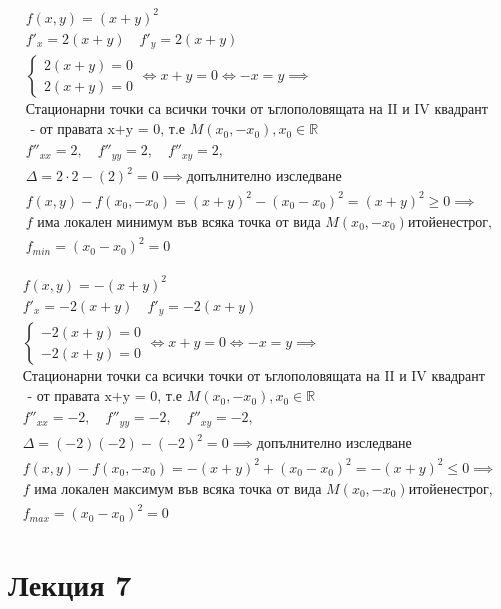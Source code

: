 \documentclass[a4paper,fleqn,12pt]{article}
\theoremstyle{definition}
\begin{document}
\begin{gather*}
f(x,y) = (x+y)^2\\
f'_x = 2(x+y) \quad f'_y = 2(x+y)  \\
\begin{cases}
2(x+y)= 0 \\ 
2(x+y) = 0 
\end{cases} 
\iff x+y = 0 \iff -x = y \implies \\
\text{Стационарни точки са всички точки от ъглополовящата на II и IV квадрант} \\
\text{ -  от правата x+y = 0, т.е $M(x_0, -x_0), x_0 \in \mathbb{R}$} \\
f''_{xx} = 2, \quad f''_{yy} = 2, \quad f''_{xy} = 2, \\
\Delta = 2 \cdot 2 - (2)^2 = 0 \implies \text{допълнително изследване} \\
f(x,y) - f(x_0, -x_0) =  (x+y)^2 - (x_0 -x_0) ^2 = (x+y)^2 \geq 0 \implies \\
f \text{ има локален минимум във всяка точка от вида } M(x_0, -x_0) и той е нестрог, \\
f_{min} = (x_0 -x_0) ^2 = 0
\end{gather*}

\begin{gather*}
f(x,y) = -(x+y)^2\\
f'_x = -2(x+y) \quad f'_y = -2(x+y)  \\
\begin{cases}
-2(x+y)= 0 \\ 
-2(x+y) = 0 
\end{cases} 
\iff x+y = 0 \iff -x = y \implies \\
\text{Стационарни точки са всички точки от ъглополовящата на II и IV квадрант} \\
\text{ -  от правата x+y = 0, т.е $M(x_0, -x_0), x_0 \in \mathbb{R}$} \\
f''_{xx} = -2, \quad f''_{yy} = -2, \quad f''_{xy} = -2, \\
\Delta = (-2)(-2) - (-2)^2 = 0 \implies \text{допълнително изследване} \\
f(x,y) - f(x_0, -x_0) =  -(x+y)^2 + (x_0 -x_0) ^2 = -(x+y)^2 \leq 0 \implies \\
f \text{ има локален максимум във всяка точка от вида } M(x_0, -x_0) и той е нестрог, \\
f_{max} = (x_0 -x_0) ^2 = 0
\end{gather*}

\newpage

\section{Лекция 7}
\end{document}
